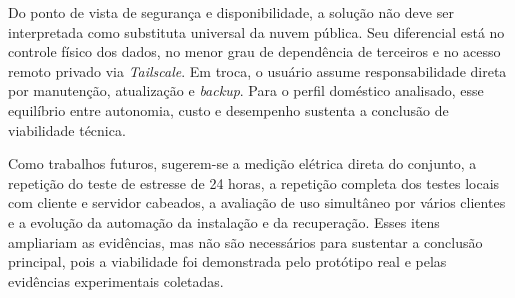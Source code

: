 Do ponto de vista de segurança e disponibilidade, a solução não deve ser interpretada como substituta universal da nuvem pública. Seu diferencial está no controle físico dos dados, no menor grau de dependência de terceiros e no acesso remoto privado via \textit{Tailscale}. Em troca, o usuário assume responsabilidade direta por manutenção, atualização e \textit{backup}. Para o perfil doméstico analisado, esse equilíbrio entre autonomia, custo e desempenho sustenta a conclusão de viabilidade técnica.

Como trabalhos futuros, sugerem-se a medição elétrica direta do conjunto, a repetição do teste de estresse de 24 horas, a repetição completa dos testes locais com cliente e servidor cabeados, a avaliação de uso simultâneo por vários clientes e a evolução da automação da instalação e da recuperação. Esses itens ampliariam as evidências, mas não são necessários para sustentar a conclusão principal, pois a viabilidade foi demonstrada pelo protótipo real e pelas evidências experimentais coletadas.
